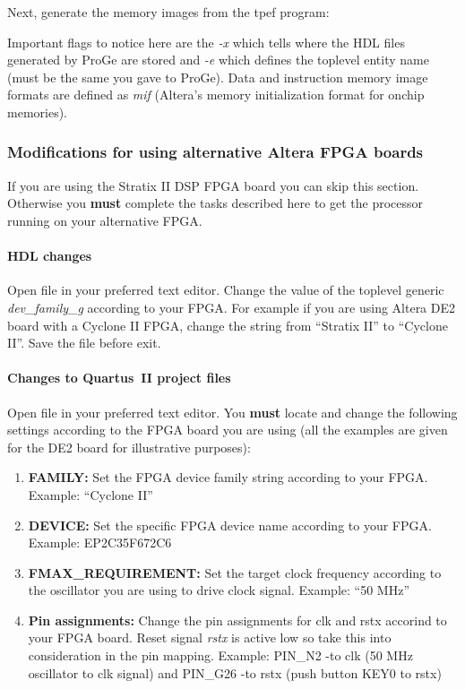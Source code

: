 \documentclass[a4paper,twoside]{tceusermanual}
\begin{document}
Next, generate the memory images from the tpef program:


Important flags to notice here are the \textit{-x} which tells where
the HDL files generated by ProGe are stored and \textit{-e} which
defines the toplevel entity name (must be the same you gave to
ProGe). Data and instruction memory image formats are defined as
\textit{mif} (Altera's memory initialization format for onchip
memories).


\subsubsection{Modifications for using alternative Altera FPGA boards}

If you are using the Stratix II DSP FPGA board you can skip this
section. Otherwise you \textbf{must} complete the tasks described here
to get the processor running on your alternative FPGA.

\paragraph{HDL changes}

Open file  in your
preferred text editor. Change the value of the toplevel generic
\textit{dev\_family\_g} according to your FPGA. For example if you are
using Altera DE2 board with a Cyclone II FPGA, change the string from
``Stratix II'' to ``Cyclone II''. Save the file before exit.

\paragraph{Changes to Quartus~II project files}

Open file  in your preferred text
editor. You \textbf{must} locate and change the following settings
according to the FPGA board you are using (all the examples are given
for the DE2 board for illustrative purposes):

\begin{enumerate}
\item%
\textbf{FAMILY:} Set the FPGA device family string according to your
FPGA. Example: ``Cyclone II''

\item%
\textbf{DEVICE:} Set the specific FPGA device name according to your
FPGA. Example: EP2C35F672C6

\item%
\textbf{FMAX\_REQUIREMENT:} Set the target clock frequency according to
the oscillator you are using to drive clock signal. Example: ``50
MHz''

\item%
\textbf{Pin assignments:} Change the pin assignments for clk and rstx
accorind to your FPGA board. Reset signal \textit{rstx} is active low
so take this into consideration in the pin mapping. Example: PIN\_N2
-to clk (50 MHz oscillator to clk signal) and PIN\_G26 -to rstx (push
button KEY0 to rstx)
\end{enumerate}
\end{document}

